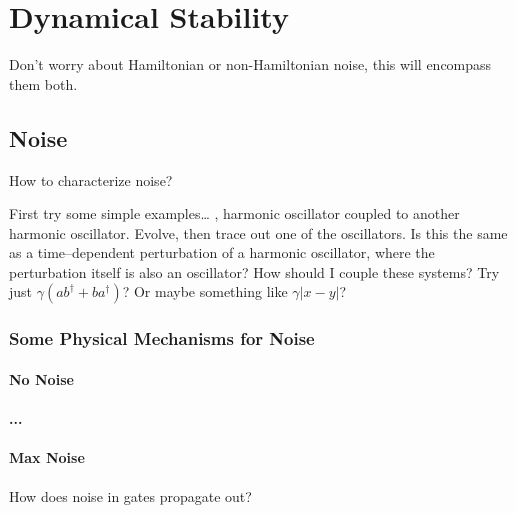 
\chapter{Dynamical Stability}
\label{chap:dynamicalStability}
%



Don't worry about Hamiltonian or non-Hamiltonian noise, this will encompass
them both.

\section{Noise}

How to characterize noise?

First try some simple examples\dots
\ie, harmonic oscillator coupled to another harmonic oscillator.
Evolve, then trace out one of the oscillators.  Is this the same as
a time--dependent perturbation of a harmonic oscillator, where the
perturbation itself is also an oscillator?  How should I couple these
systems?  Try just $\gamma\left( a b^\dagger + b a^\dagger\right)$?
Or maybe something like $\gamma\left| x-y\right|$?


\subsection{Some Physical Mechanisms for Noise}

\subsubsection{No Noise}
\subsubsection{...}
\subsubsection{Max Noise}


How does noise in gates propagate out?

